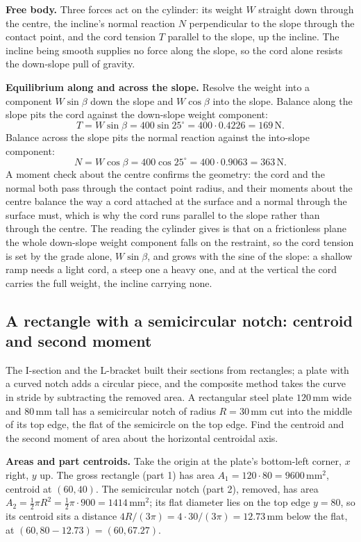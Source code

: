 \textbf{Free body.} Three forces act on the cylinder: its weight $W$ straight
down through the centre, the incline's normal reaction $N$ perpendicular to the
slope through the contact point, and the cord tension $T$ parallel to the slope,
up the incline. The incline being smooth supplies no force along the slope, so
the cord alone resists the down-slope pull of gravity.

\textbf{Equilibrium along and across the slope.} Resolve the weight into a
component $W\sin\beta$ down the slope and $W\cos\beta$ into the slope. Balance
along the slope pits the cord against the down-slope weight component:
\[
T = W\sin\beta = 400\sin 25^\circ = 400 \cdot 0.4226 = 169\,\text{N}.
\]
Balance across the slope pits the normal reaction against the into-slope
component:
\[
N = W\cos\beta = 400\cos 25^\circ = 400 \cdot 0.9063 = 363\,\text{N}.
\]
A moment check about the centre confirms the geometry: the cord and the normal
both pass through the contact point radius, and their moments about the centre
balance the way a cord attached at the surface and a normal through the surface
must, which is why the cord runs parallel to the slope rather than through the
centre. The reading the cylinder gives is that on a frictionless plane the whole
down-slope weight component falls on the restraint, so the cord tension is set
by the grade alone, $W\sin\beta$, and grows with the sine of the slope: a
shallow ramp needs a light cord, a steep one a heavy one, and at the vertical
the cord carries the full weight, the incline carrying none.

\subsection{A rectangle with a semicircular notch: centroid and second moment}

The I-section and the L-bracket built their sections from rectangles; a plate
with a curved notch adds a circular piece, and the composite method takes the
curve in stride by subtracting the removed area. A rectangular steel plate
$120\,\si{\milli\meter}$ wide and $80\,\si{\milli\meter}$ tall has a
semicircular notch of radius $R = 30\,\si{\milli\meter}$ cut into the middle of
its top edge, the flat of the semicircle on the top edge. Find the centroid and
the second moment of area about the horizontal centroidal axis.

\textbf{Areas and part centroids.} Take the origin at the plate's bottom-left
corner, $x$ right, $y$ up. The gross rectangle (part 1) has area
$A_1 = 120 \cdot 80 = 9600\,\si{\milli\meter\squared}$, centroid at
$(60, 40)$. The semicircular notch (part 2), removed, has area
$A_2 = \tfrac12\pi R^2 = \tfrac12\pi\cdot 900 = 1414\,\si{\milli\meter\squared}$;
its flat diameter lies on the top edge $y = 80$, so its centroid sits a distance
$4R/(3\pi) = 4 \cdot 30/(3\pi) = 12.73\,\si{\milli\meter}$ below the flat, at
$(60, 80 - 12.73) = (60, 67.27)$.

